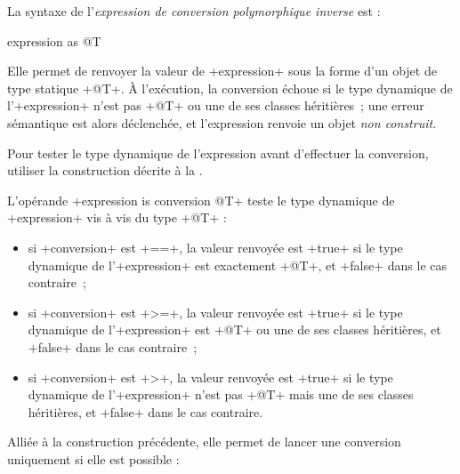 
La syntaxe de l'\emph{expression de conversion polymorphique inverse} est :

\begin{galgas4box}
expression as @T
\end{galgas4box}

Elle permet de renvoyer la valeur de \ggsq+expression+ sous la forme d'un objet de type statique \ggsq+@T+. À l'exécution, la conversion échoue si le type dynamique de l'\ggsq+expression+ n'est pas \ggsq+@T+ ou une de ses classes héritières~; une erreur sémantique est alors déclenchée, et l'expression renvoie un objet \emph{non construit}.

Pour tester le type dynamique de l'expression avant d'effectuer la conversion, utiliser la construction décrite à la .







L'opérande \ggsq+expression is conversion @T+ teste le type dynamique de \ggsq+expression+ vis à vis du type \ggsq+@T+ :
\begin{itemize}
\item si \ggsq+conversion+ est \ggsq+==+, la valeur renvoyée est \ggsq+true+ si le type dynamique de l'\ggsq+expression+ est exactement \ggsq+@T+, et \ggsq+false+ dans le cas contraire~;
\item si \ggsq+conversion+ est  \ggsq+>=+, la valeur renvoyée est \ggsq+true+ si le type dynamique de l'\ggsq+expression+ est \ggsq+@T+ ou une de ses classes héritières, et \ggsq+false+ dans le cas contraire~;
\item si \ggsq+conversion+ est  \ggsq+>+, la valeur renvoyée est \ggsq+true+ si le type dynamique de l'\ggsq+expression+ n'est pas \ggsq+@T+ mais une de ses classes héritières, et \ggsq+false+ dans le cas contraire.
\end{itemize}



Alliée à la construction précédente, elle permet de lancer une conversion uniquement si elle est possible :

